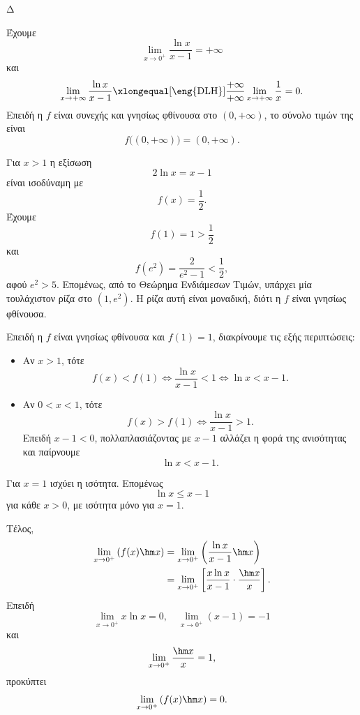 \begin{thema}{Δ}
\begin{erwthma}
\item Έχουμε
\[
\lim_{x\to0^+}\frac{\ln x}{x-1}=+\infty
\]
και
\[
\lim_{x\to+\infty}\frac{\ln x}{x-1}
\xlongequal[\text{\eng{DLH}}]{\frac{+\infty}{+\infty}}
\lim_{x\to+\infty}\frac{1}{x}
=0.
\]
Επειδή η $f$ είναι συνεχής και γνησίως φθίνουσα στο $(0,+\infty)$, το σύνολο τιμών της είναι
\[
{f\big((0,+\infty)\big)=(0,+\infty)}.
\]

Για $x>1$ η εξίσωση
\[
2\ln x=x-1
\]
είναι ισοδύναμη με
\[
f(x)=\frac{1}{2}.
\]
Έχουμε
\[
f(1)=1>\frac{1}{2}
\]
και
\[
f(e^2)=\frac{2}{e^2-1}<\frac{1}{2},
\]
αφού $e^2>5$. Επομένως, από το Θεώρημα Ενδιάμεσων Τιμών, υπάρχει μία τουλάχιστον ρίζα στο $(1,e^2)$. Η ρίζα αυτή είναι μοναδική, διότι η $f$ είναι γνησίως φθίνουσα.

\item Επειδή η $f$ είναι γνησίως φθίνουσα και $f(1)=1$, διακρίνουμε τις εξής περιπτώσεις:
\begin{itemize}
\item Αν $x>1$, τότε
\[
f(x)<f(1)
\Leftrightarrow
\frac{\ln x}{x-1}<1
\Leftrightarrow
\ln x<x-1.
\]
\item Αν $0<x<1$, τότε
\[
f(x)>f(1)
\Leftrightarrow
\frac{\ln x}{x-1}>1.
\]
Επειδή $x-1<0$, πολλαπλασιάζοντας με $x-1$ αλλάζει η φορά της ανισότητας και παίρνουμε
\[
\ln x<x-1.
\]
\end{itemize}
Για $x=1$ ισχύει η ισότητα. Επομένως
\[
{\ln x\leq x-1}
\]
για κάθε $x>0$, με ισότητα μόνο για $x=1$.

Τέλος,
\begin{align*}
\lim_{x\to0^+}\left(f(x)\hm x\right)
&=\lim_{x\to0^+}
\left(
\frac{\ln x}{x-1}\hm x
\right)\\
&=\lim_{x\to0^+}
\left[
\frac{x\ln x}{x-1}\cdot\frac{\hm x}{x}
\right].
\end{align*}
Επειδή
\[
\lim_{x\to0^+}x\ln x=0,
\quad
\lim_{x\to0^+}(x-1)=-1
\]
και
\[
\lim_{x\to0^+}\frac{\hm x}{x}=1,
\]
προκύπτει
\[
{\lim_{x\to0^+}\left(f(x)\hm x\right)=0}.
\]
\end{erwthma}
\end{thema}
